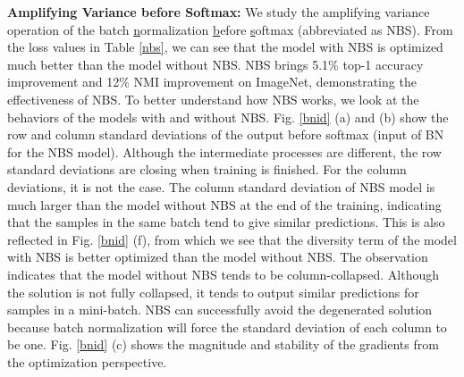 \documentclass[10pt,twocolumn,letterpaper]{article}
\begin{document}
\textbf{Amplifying Variance before Softmax:} We study the amplifying variance operation of the batch \underline{n}ormalization \underline{b}efore \underline{s}oftmax (abbreviated as NBS). 
From the loss values in Table \ref{nbs}, we can see that the model with NBS is optimized much better than the model without NBS. NBS brings 5.1\% top-1 accuracy improvement and 12\% NMI improvement on ImageNet, demonstrating the effectiveness of NBS. 
To better understand how NBS works, we look at the behaviors of the models with and without NBS. Fig. \ref{bnid} (a) and (b) show the row and column standard deviations of the output before softmax (input of BN for the NBS model). Although the intermediate processes are different, the row standard deviations are closing when training is finished. For the column deviations, it is not the case. The column standard deviation of NBS model is much larger than the model without NBS at the end of the training, indicating that the samples in the same batch tend to give similar predictions. This is also reflected in Fig. \ref{bnid} (f), from which we see that the diversity term of the model with NBS is better optimized than the model without NBS.
The observation indicates that the model without NBS tends to be column-collapsed. Although the solution is not fully collapsed, it tends to output similar predictions for samples in a mini-batch. NBS can successfully avoid the degenerated solution because batch normalization will force the standard deviation of each column to be one. Fig. \ref{bnid} (c) shows the magnitude and stability of the gradients from the optimization perspective.
\begin{table}[h]
    \centering
    \vspace{-0.2cm}
    \caption{Ablation study on batch normalization before softmax.}
    \label{nbs}
    \vspace{-0.3cm}
\end{table}
\end{document}
